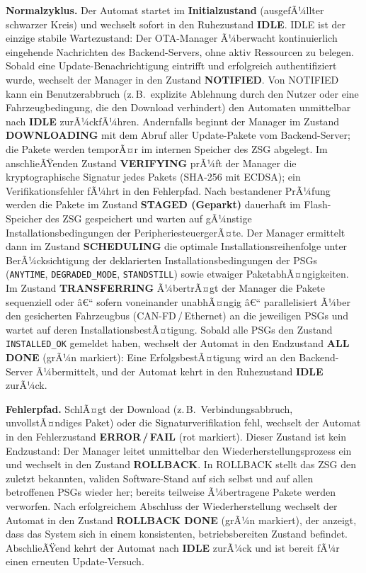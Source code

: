﻿\documentclass[12pt,a4paper,twoside]{article}
\begin{document}
\smallskip
\noindent\textbf{Normalzyklus.}
Der Automat startet im \textbf{Initialzustand} (ausgefÃ¼llter schwarzer
Kreis) und wechselt sofort in den Ruhezustand \textbf{IDLE}.
IDLE ist der einzige stabile Wartezustand: Der OTA-Manager Ã¼berwacht
kontinuierlich eingehende Nachrichten des Backend-Servers, ohne aktiv
Ressourcen zu belegen.
Sobald eine Update-Benachrichtigung eintrifft und erfolgreich
authentifiziert wurde, wechselt der Manager in den Zustand
\textbf{NOTIFIED}.
Von NOTIFIED kann ein Benutzerabbruch (z.\,B.\ explizite Ablehnung durch
den Nutzer oder eine Fahrzeugbedingung, die den Download verhindert) den
Automaten unmittelbar nach \textbf{IDLE} zurÃ¼ckfÃ¼hren.
Andernfalls beginnt der Manager im Zustand \textbf{DOWNLOADING} mit dem
Abruf aller Update-Pakete vom Backend-Server; die Pakete werden temporÃ¤r
im internen Speicher des ZSG abgelegt.
Im anschlieÃŸenden Zustand \textbf{VERIFYING} prÃ¼ft der Manager die
kryptographische Signatur jedes Pakets (SHA-256 mit ECDSA); ein
Verifikationsfehler fÃ¼hrt in den Fehlerpfad.
Nach bestandener PrÃ¼fung werden die Pakete im Zustand
\textbf{STAGED (Geparkt)} dauerhaft im Flash-Speicher des ZSG
gespeichert und warten auf gÃ¼nstige Installationsbedingungen der
PeripheriesteuergerÃ¤te.
Der Manager ermittelt dann im Zustand \textbf{SCHEDULING} die optimale
Installationsreihenfolge unter BerÃ¼cksichtigung der deklarierten
Installationsbedingungen der PSGs (\texttt{ANYTIME},
\texttt{DEGRADED\_MODE}, \texttt{STANDSTILL}) sowie etwaiger
PaketabhÃ¤ngigkeiten.
Im Zustand \textbf{TRANSFERRING} Ã¼bertrÃ¤gt der Manager die Pakete
sequenziell oder â€“ sofern voneinander unabhÃ¤ngig â€“ parallelisiert Ã¼ber
den gesicherten Fahrzeugbus (CAN-FD\,/\,Ethernet) an die jeweiligen
PSGs und wartet auf deren InstallationsbestÃ¤tigung.
Sobald alle PSGs den Zustand \texttt{INSTALLED\_OK} gemeldet haben,
wechselt der Automat in den Endzustand \textbf{ALL DONE} (grÃ¼n
markiert): Eine ErfolgsbestÃ¤tigung wird an den Backend-Server Ã¼bermittelt,
und der Automat kehrt in den Ruhezustand \textbf{IDLE} zurÃ¼ck.

\smallskip
\noindent\textbf{Fehlerpfad.}
SchlÃ¤gt der Download (z.\,B.\ Verbindungsabbruch, unvollstÃ¤ndiges Paket)
oder die Signaturverifikation fehl, wechselt der Automat in den
Fehlerzustand \textbf{ERROR\,/\,FAIL} (rot markiert).
Dieser Zustand ist kein Endzustand: Der Manager leitet unmittelbar den
Wiederherstellungsprozess ein und wechselt in den Zustand
\textbf{ROLLBACK}.
In ROLLBACK stellt das ZSG den zuletzt bekannten, validen Software-Stand
auf sich selbst und auf allen betroffenen PSGs wieder her;
bereits teilweise Ã¼bertragene Pakete werden verworfen.
Nach erfolgreichem Abschluss der Wiederherstellung wechselt der Automat
in den Zustand \textbf{ROLLBACK DONE} (grÃ¼n markiert), der anzeigt, dass
das System sich in einem konsistenten, betriebsbereiten Zustand befindet.
AbschlieÃŸend kehrt der Automat nach \textbf{IDLE} zurÃ¼ck und ist bereit
fÃ¼r einen erneuten Update-Versuch.
\end{document}
